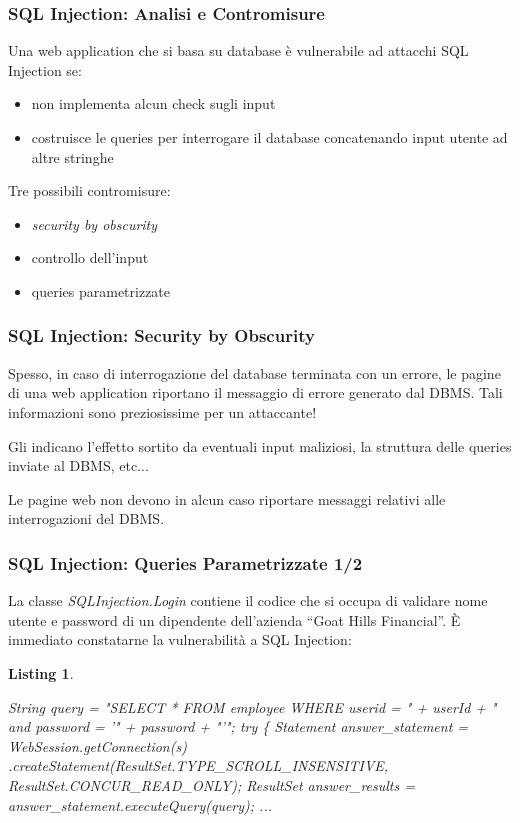 \documentclass{beamer}
\newtheorem{codice}{Listing}
\begin{document}
\begin{frame}
  \frametitle{SQL Injection: Analisi e Contromisure}
  Una web application che si basa su database \`e vulnerabile ad attacchi SQL Injection se:
  \begin{itemize}
  \item non implementa alcun check sugli input
  \item costruisce le queries per interrogare il database concatenando input utente ad altre stringhe
  \end{itemize}
  \pause
  \medskip
  Tre possibili contromisure:
  \begin{itemize}
  \item \emph{security by obscurity}
  \item controllo dell'input
  \item queries parametrizzate
  \end{itemize}
\end{frame}

\begin{frame}
  \frametitle{SQL Injection: Security by Obscurity}
  Spesso, in caso di interrogazione del database terminata con un errore, le pagine di una web application riportano il messaggio di errore generato dal DBMS.
  \pause
  \medskip
  \newline
  \alert{Tali informazioni sono preziosissime per un attaccante!}
  \begin{tiny}
    \newline
    Gli indicano l'effetto sortito da eventuali input maliziosi, la struttura delle queries inviate al DBMS, etc...
  \end{tiny}
  \medskip
  \pause
  \newline
  Le pagine web non devono in alcun caso riportare messaggi relativi alle interrogazioni del DBMS.
\end{frame}
  
\begin{frame}[fragile]
  \frametitle{SQL Injection: Queries Parametrizzate 1/2}
  La classe {\it SQLInjection.Login} contiene il codice che si occupa di validare nome utente e password di un dipendente dell'azienda ``Goat Hills Financial''.
  \newline
  \pause
  \medskip
  \`E immediato constatarne la vulnerabilit\`a a SQL Injection:
  \begin{tiny}
    \begin{codice}
      \begin{semiverbatim}
String query = "SELECT * FROM employee WHERE 
                                       userid = " + userId + " 
                                   and password = '" + password + "'";
try
\{
  Statement answer_statement = WebSession.getConnection(s)
      .createStatement(ResultSet.TYPE_SCROLL_INSENSITIVE, 
                       ResultSet.CONCUR_READ_ONLY);
  ResultSet answer_results = answer_statement.executeQuery(query);
  ...
      \end{semiverbatim}
    \end{codice}
  \end{tiny}
\end{frame}
\end{document}
